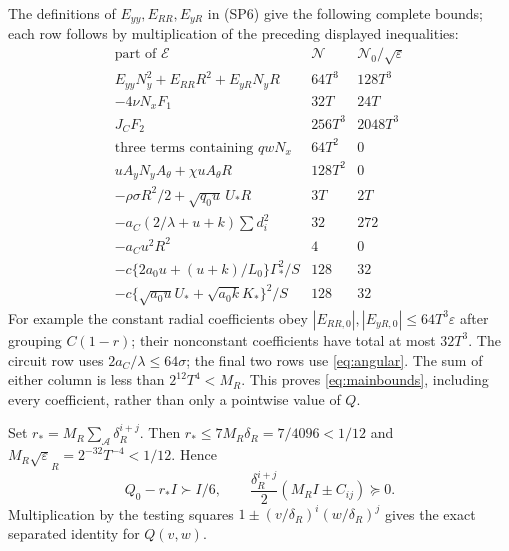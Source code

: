 \documentclass[11pt]{article}
\newcommand{\eps}{\varepsilon}
\newcommand{\sigs}{\sigma}
\begin{document}
The definitions of $E_{yy},E_{RR},E_{yR}$ in (SP6) give the following
complete bounds; each row follows by multiplication of the preceding
displayed inequalities:
\[
\begin{array}{l|c|c}
 \text{part of }\mathcal E&\mathcal N&\mathcal N_0/\sqrt\eps\\\hline
 E_{yy}N_y^2+E_{RR}R^2+E_{yR}N_yR&64T^3&128T^3\\
 -4\nu N_xF_1&32T&24T\\
 J_CF_2&256T^3&2048T^3\\
 \text{three terms containing }qwN_x&64T^2&0\\
 uA_yN_yA_\theta+\chi uA_\theta R&128T^2&0\\
 -\rho\sigs R^2/2+\sqrt{q_0u}\,U_*R&3T&2T\\
 -a_C(2/\lambda+u+k)\sum d_i^2&32&272\\
 -a_Cu^2R^2&4&0\\
 -c\{2a_0u+(u+k)/L_0\}\Gamma_*^2/S&128&32\\
 -c\{\sqrt{a_0u}U_*+\sqrt{a_0k}K_*\}^2/S&128&32
\end{array}
\]
For example the constant radial coefficients obey
$|E_{RR,0}|,|E_{yR,0}|\le64T^3\eps$ after grouping
$C(1-r)$; their nonconstant coefficients have total at most $32T^3$.
The circuit row uses $2a_C/\lambda\le64\sigs$; the final two rows use
\eqref{eq:angular}. The sum of either column is less than
$2^{12}T^4<M_R$. This proves \eqref{eq:mainbounds}, including every
coefficient, rather than only a pointwise value of $Q$.

Set $r_*=M_R\sum_{\mathcal A}\delta_R^{i+j}$.
Then $r_*\le7M_R\delta_R=7/4096<1/12$ and
$M_R\sqrt\eps_R=2^{-32}T^{-4}<1/12$. Hence
\[
 Q_0-r_*I\succ I/6,\qquad
 \frac{\delta_R^{i+j}}2(M_RI\pm C_{ij})\succeq0.
\]
Multiplication by the testing squares
$1\pm(v/\delta_R)^i(w/\delta_R)^j$ gives the exact separated identity
for $Q(v,w)$.
\end{document}

